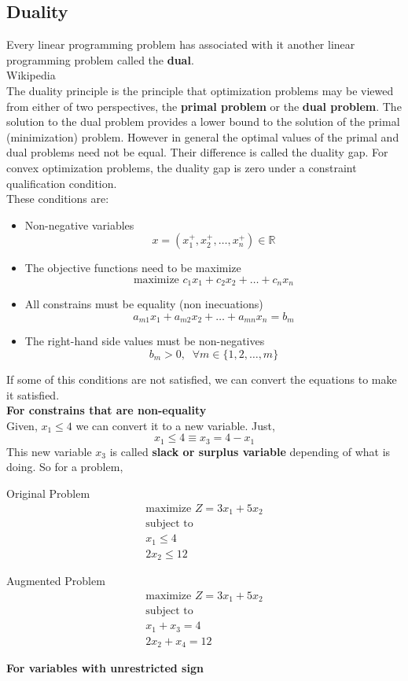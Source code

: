 \subsection{Duality}
Every linear programming problem has associated with it another linear programming
problem called the \textbf{dual}.\\

Wikipedia\\
The duality principle is the principle that optimization problems may be viewed from either of two perspectives, the \textbf{primal problem} or the \textbf{dual problem}. 
The solution to the dual problem provides a lower bound to the solution of the primal (minimization) problem. However in general the optimal values of 
the primal and dual problems need not be equal. Their difference is called the duality gap. For convex optimization problems, the duality gap is zero under 
a constraint qualification condition. \\

These conditions are:
\begin{itemize}
    \item Non-negative variables
    \[x = (x_1^+, x_2^+, \dots , x_n^+) \in \mathbb{R}\]
    \item The objective functions need to be maximize
    \[ \text{maximize } c_1x_1 + c_2x_2 + \dots + c_nx_n\]
    \item All constrains must be equality (non inecuations)
    \[ a_{m1}x_1 + a_{m2}x_2 + \dots + a_{mn}x_n = b_m \]
    \item The right-hand side values must be non-negatives
    \[ b_m > 0,\;\; \forall m \in \{1,2,\dots,m\} \]
\end{itemize}

If some of this conditions are not satisfied, we can convert the equations to make it satisfied.\\
\textbf{For constrains that are non-equality}\\
Given, $x_1 \leq 4$ we can convert it to a new variable. Just,
\[ x_1 \leq 4 \equiv  x_3 = 4 - x_1\]
This new variable $x_3$ is called \textbf{slack or surplus variable} depending of what is doing. So for a problem,
\setlength{\columnseprule}{1pt}
\begin{multicols}{2}
    Original Problem \begin{multline*} 
        \text{maximize } Z = 3x_1 + 5x_2 \\
        \text{subject to }\\
        x_1 \leq 4\\
        2x_2 \leq 12
    \end{multline*}

    Augmented Problem \begin{multline*}
        \text{maximize } Z = 3x_1 + 5x_2 \\
        \text{subject to }\\
        x_1 + x_3 = 4\\
        2x_2 + x_4 = 12
    \end{multline*}
\end{multicols}
\textbf{For variables with unrestricted sign}\\

